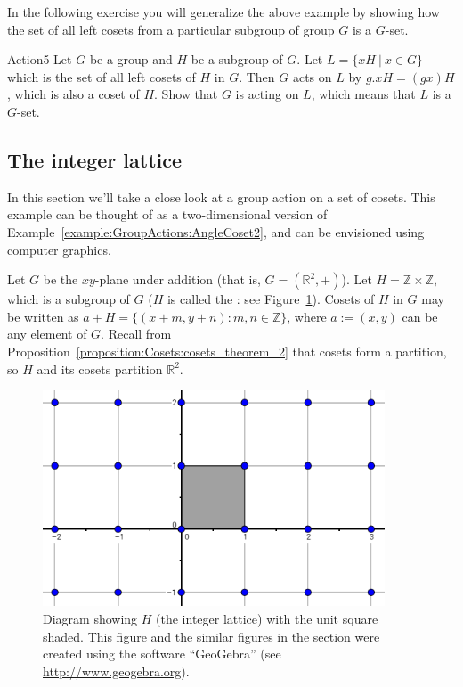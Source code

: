 In the following exercise you will generalize the above example by showing how the set of all left cosets from a particular subgroup of group $G$ is a $G$-set.

\begin{exercise}{Action5}
Let $G$ be a group and $H$ be a subgroup of $G$. Let $L=\{xH~|~x\in G \}$ which is the set of all left cosets of $H$ in $G$. Then $G$ acts on $L$ by $g.xH = (gx)H$, which is also a coset of $H$. Show that $G$ is acting on $L$, which means that $L$ is a $G$-set.
\end{exercise}


\subsection{The integer lattice}
\label{subsec:GroupActions:SubgroupsAndCosets:lattice}

In this section we'll take a close look at a group action on a set of cosets.  This example can be thought of as a two-dimensional version of Example~\ref{example:GroupActions:AngleCoset2}, and can be envisioned using computer graphics.


Let $G$ be the $xy$-plane under addition (that is, $G=(\mathbb {R}^2,+)$).  Let $H=\mathbb{Z}\times \mathbb{Z}$, which is a subgroup of $G$ ($H$ is called the : see Figure~\ref{fig:HwithUnitSquare}).
Cosets of $H$ in $G$ may be written as $a+H=\{(x+m, y+n):m,n \in\mathbb{ Z}\}$, where $a :=(x,y)$ can be any element of $G$. Recall from Proposition~\ref{proposition:Cosets:cosets_theorem_2} that cosets form a partition, so $H$ and its cosets partition $\mathbb{R}^2$.

\begin{figure}[htpb]
\begin{center}
\includegraphics[width=4in]{images/Lattice_Hwithunitsquare.png}
\caption{\label{fig:HwithUnitSquare}Diagram showing $H$ (the integer lattice) with the unit square shaded. This figure and the similar figures in the section were created using the software ``GeoGebra'' (see \url{http://www.geogebra.org}).  }
\end{center}
\end{figure}


